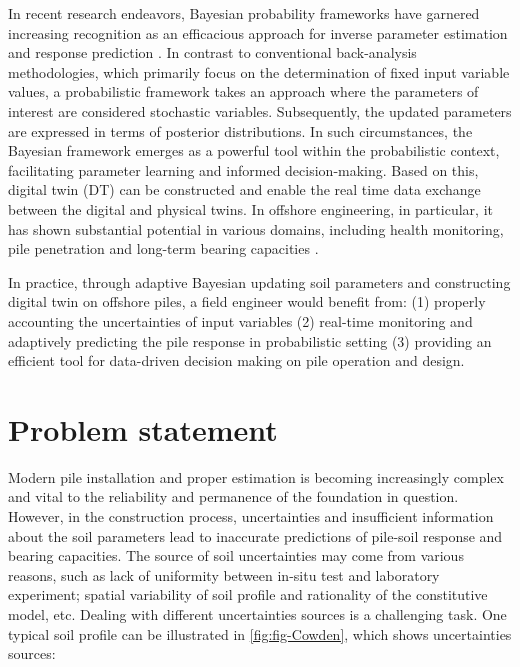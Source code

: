 In recent research endeavors, Bayesian probability frameworks have garnered increasing recognition as an efficacious approach for inverse parameter estimation and response prediction \citep{finno2005,nakamura2011,hsein2013,nguyen2016,wagner2020,jin2021,tao2021,buckley2023,tang2023}. In contrast to conventional back-analysis methodologies, which primarily focus on the determination of fixed input variable values, a probabilistic framework takes an approach where the parameters of interest are considered stochastic variables. Subsequently, the updated parameters are expressed in terms of posterior distributions. In such circumstances, the Bayesian framework emerges as a powerful tool within the probabilistic context, facilitating parameter learning and informed decision-making. Based on this, digital twin (DT) can be constructed and enable the real time data exchange between the digital and physical twins. In offshore engineering, in particular, it has shown substantial potential in various domains, including health monitoring, pile penetration and long-term bearing capacities \citep{wang2021,zhao2023,stuyts2023}. 

In practice, through adaptive Bayesian updating soil parameters and constructing digital twin on offshore piles, a field engineer would benefit from: (1) properly accounting the uncertainties of input variables (2) real-time monitoring and adaptively predicting the pile response in probabilistic setting (3) providing an efficient tool for data-driven decision making on pile operation and design.



\section{Problem statement}

Modern pile installation and proper estimation is becoming increasingly complex and vital to the reliability and permanence of the foundation in question. However, in the construction process, uncertainties and insufficient information about the soil parameters lead to inaccurate predictions of pile-soil response and bearing capacities. The source of soil uncertainties may come from various reasons, such as lack of uniformity between in-situ test and laboratory experiment; spatial variability of soil profile and rationality of the constitutive model, etc. Dealing with different uncertainties sources is a challenging task. One typical soil profile can be illustrated in \cref{fig:fig-Cowden}, which shows uncertainties sources:

